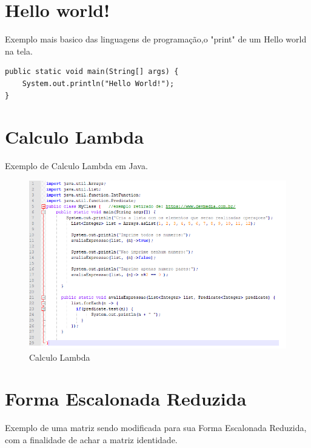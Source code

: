 \documentclass[
	12pt,				%
	openright,			%
	oneside,			%
	a4paper,			%
	english,			%
	french,				%
	spanish,			%
	brazil				%
	]{abntex2}
\begin{document}
\section{Hello world!}
Exemplo mais basico das linguagens de programação,o "print" de um Hello world na tela.

\begin{lstlisting}
public static void main(String[] args) {
	System.out.println("Hello World!");
}
\end{lstlisting}

\section{Calculo Lambda}

Exemplo de Calculo Lambda em Java.

\begin{figure}[!h]
\centering
  \includegraphics[width=0.8\linewidth]{calculoLmb.png}
  \caption{Calculo Lambda}
  \label{fig:Calc}
\end{figure}



\section{Forma Escalonada Reduzida}

Exemplo de uma matriz sendo modificada para sua Forma Escalonada Reduzida, com a finalidade de achar a matriz identidade.
\end{document}
